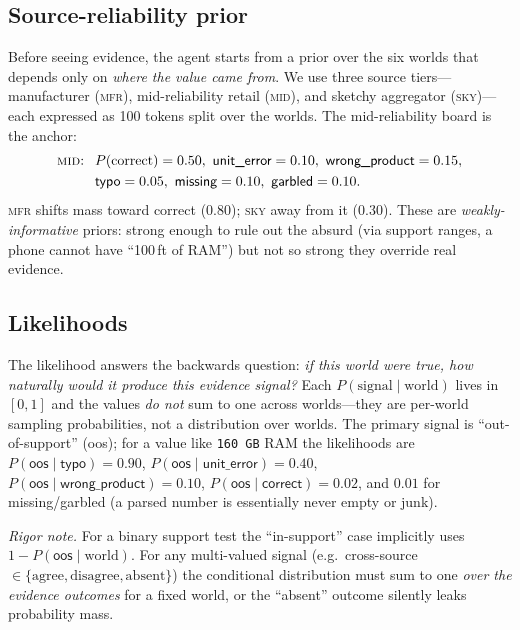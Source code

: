 \documentclass[11pt]{article}
\newcommand{\pcorrect}{P(\text{correct})}
\begin{document}
\subsection{Source-reliability prior}
Before seeing evidence, the agent starts from a prior over the six worlds that depends
only on \emph{where the value came from}. We use three source tiers---manufacturer
(\textsc{mfr}), mid-reliability retail (\textsc{mid}), and sketchy aggregator
(\textsc{sky})---each expressed as 100 tokens split over the worlds. The
mid-reliability board is the anchor:
\[
\begin{aligned}
\text{\textsc{mid}: }\ &\pcorrect=0.50,\ \textsf{unit\_error}=0.10,\ \textsf{wrong\_product}=0.15,\\
&\textsf{typo}=0.05,\ \textsf{missing}=0.10,\ \textsf{garbled}=0.10.
\end{aligned}
\]
\textsc{mfr} shifts mass toward \textsf{correct} ($0.80$); \textsc{sky} away from it
($0.30$). These are \emph{weakly-informative} priors: strong enough to rule out the
absurd (via support ranges, a phone cannot have ``100\,ft of RAM'') but not so strong
they override real evidence.

\subsection{Likelihoods}
The likelihood answers the backwards question: \emph{if this world were true, how
naturally would it produce this evidence signal?} Each $P(\text{signal}\mid
\text{world})$ lives in $[0,1]$ and the values \emph{do not} sum to one across
worlds---they are per-world sampling probabilities, not a distribution over worlds.
The primary signal is ``out-of-support'' (\textsf{oos}); for a value like
\texttt{160\,GB} RAM the likelihoods are $P(\textsf{oos}\mid\textsf{typo})=0.90$,
$P(\textsf{oos}\mid\textsf{unit\_error})=0.40$,
$P(\textsf{oos}\mid\textsf{wrong\_product})=0.10$,
$P(\textsf{oos}\mid\textsf{correct})=0.02$, and $0.01$ for
\textsf{missing}/\textsf{garbled} (a parsed number is essentially never empty or junk).

\emph{Rigor note.} For a binary support test the ``in-support'' case implicitly uses
$1-P(\textsf{oos}\mid\text{world})$. For any multi-valued signal (e.g.\ cross-source
$\in\{\text{agree},\text{disagree},\text{absent}\}$) the conditional distribution must
sum to one \emph{over the evidence outcomes} for a fixed world, or the ``absent''
outcome silently leaks probability mass.
\end{document}
